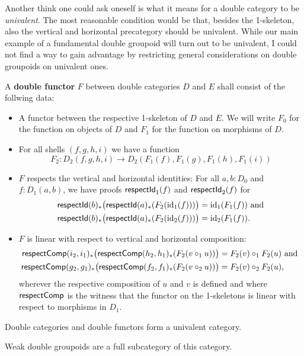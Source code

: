 Another think one could ask oneself is what it means for a double category to
be \emph{univalent}.
The most reasonable condition would be that, besides the 1-skeleton, also the
vertical and horizontal precategory should be univalent.
While our main example of a fundamental double groupoid will turn out to be univalent,
I could not find a way to gain advantage by restricting general considerations
on double groupoids on univalent ones. %

\begin{defn} \label{defl:dbl-functor-hott}
A \textbf{double functor} $F$ between double categories $D$ and $E$ shall consist
of the follwing data:
\begin{itemize}
\item A functor between the respective 1-skeleton of $D$ and $E$.
We will write $F_0$ for the function on objects of $D$ and $F_1$ for the function
on morphisms of $D$.
\item For all shells $(f,g,h,i)$ we have a function
\begin{equation*}
F_2 : D_2(f,g,h,i) \to D_2(F_1(f),F_1(g),F_1(h),F_1(i))
\end{equation*}
\item $F$ respects the vertical and horizontal identities: For all $a,b:D_0$
and $f:D_1(a,b)$, we have proofs $\mathsf{respectId}_1(f)$ and $\mathsf{respectId}_2(f)$ for
\begin{align*}
\mathsf{respectId}(b)_*\big(\mathsf{respectId}(a)_*(F_2(\operatorname{id}_1(f)))\big) &= \operatorname{id}_1(F_1(f)) \text{ and} \\
\mathsf{respectId}(b)_*\big(\mathsf{respectId}(a)_*(F_2(\operatorname{id}_2(f)))\big) &= \operatorname{id}_2(F_1(f)) \text{.}
\end{align*}
\item $F$ is linear with respect to vertical and horizontal composition:
\begin{align*}
\mathsf{respectComp}(i_2,i_1)_*\big(\mathsf{respectComp}(h_2,h_1)_*(F_2(v \circ_1 u))\big)
	&= F_2(v) \circ_1 F_2(u) \text{ and } \\
\mathsf{respectComp}(g_2,g_1)_*\big(\mathsf{respectComp}(f_2,f_1)_*(F_2(v \circ_2 u))\big)
	&= F_2(v) \circ_2 F_2(u) \text{,}
\end{align*}
wherever the respective composition of $u$ and $v$ is defined and where
$\mathsf{respectComp}$ is the witness that the functor on the 1-skeletons is linear with
respect to morphisms in $D_1$.
\end{itemize}
\end{defn}

\begin{lemma}
Double categories and double functors form a univalent category.

Weak double groupoids are a full subcategory of this category.
\end{lemma}

